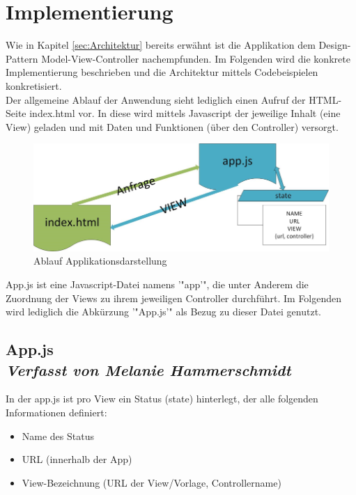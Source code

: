\newpage
\section{Implementierung}

Wie in Kapitel \ref{sec:Architektur} bereits erwähnt ist die Applikation dem Design-Pattern Model-View-Controller nachempfunden. Im Folgenden wird die konkrete Implementierung beschrieben und die Architektur mittels Codebeispielen konkretisiert.
\\
Der allgemeine Ablauf der Anwendung sieht lediglich einen Aufruf der HTML-Seite index.html vor. In diese wird mittels Javascript der jeweilige Inhalt (eine View) geladen und mit Daten und Funktionen (über den Controller) versorgt.
\begin{figure}[h]
\centering
\includegraphics[width=1\textwidth]{ref/images/index.png}
\caption[Ablauf Applikationsdarstellung]{Ablauf Applikationsdarstellung}
\label{fig:HTML-Darstellung}
\end{figure}

App.js ist eine Javascript-Datei namens '"app'", die unter Anderem die Zuordnung der Views zu ihrem jeweiligen Controller durchführt. Im Folgenden wird lediglich die Abkürzung '"App.js'" als Bezug zu dieser Datei genutzt.
\subsection[App.js]{App.js
 \\ \textnormal{\small{\textit {Verfasst von Melanie Hammerschmidt}}}}
 
In der app.js ist pro View ein Status (state) hinterlegt, der alle folgenden Informationen definiert:
\begin{itemize}
\item Name des Status
\item URL (innerhalb der App)
\item View-Bezeichnung (URL der View/Vorlage, Controllername)
\end{itemize}

